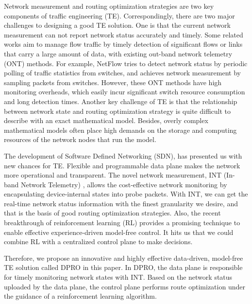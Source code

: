 \documentclass[10pt,conference]{IEEEtran}
\begin{document}
Network measurement and routing optimization strategies are two key components of traffic engineering (TE). Correspondingly, there are two major challenges to designing a good TE solution. One is that the current network measurement can not report network status accurately and timely. Some related works \cite{alizadeh2014conga}\cite{akyildiz2014roadmap}\cite{katta2016hula} aim to manage flow traffic by timely detection of significant flows or links that carry a large amount of data, with existing out-band network telemetry (ONT) methods. For example, NetFlow \cite{estan2004building} tries to detect network status by periodic polling of traffic statistics from switches, and \cite{wang2004sflow} achieves network measurement by sampling packets from switches. However, these ONT methods have high monitoring overheads, which easily incur significant switch resource consumption and long detection times. Another key challenge of TE is that the relationship between network state and routing optimization strategy is quite difficult to describe with an exact mathematical model\cite{Azar2003Optimal}. Besides, overly complex mathematical models often place high demands on the storage and computing resources of the network nodes that run the model.

The development of Software Defined Networking (SDN)\cite{mckeown2009software}, has presented us with new chances for TE. Flexible and programmable data plane makes the network more operational and transparent. The novel network measurement, INT (In-band Network Telemetry) \cite{kim2015band}, allows the cost-effective network monitoring by encapsulating device-internal states into probe packets. With INT, we can get the real-time network status information with the finest granularity we desire, and that is the basis of good routing optimization strategies. Also, the recent breakthrough of reinforcement learning (RL)\cite{kaelbling1996reinforcement} provides a promising technique to enable effective experience-driven model-free control. It hits us that we could combine RL with a centralized control plane to make decisions.

Therefore, we propose an innovative and highly effective data-driven, model-free TE solution called DPRO in this paper. In DPRO, the data plane is responsible for timely monitoring network states with INT. Based on the network status uploaded by the data plane, the control plane performs route optimization under the guidance of a reinforcement learning algorithm.
\end{document}
